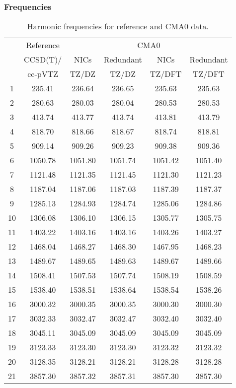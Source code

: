 \documentclass[10pt,oneside]{article}
\begin{document}
\begin{table}[h!]
\subsubsection*{Frequencies}
\centering
\caption{Harmonic frequencies for reference and CMA0 data.}
\begin{tabular}{cccccc}
\toprule
{} & Reference & \multicolumn{4}{c}{CMA0} \\
{} &  CCSD(T)/ &    NICs &  Redundant &    NICs & Redundant \\
{} &   cc-pVTZ &   TZ/DZ &      TZ/DZ &  TZ/DFT &    TZ/DFT \\
\midrule
1  &    235.41 &  236.64 &     236.65 &  235.63 &    235.63 \\
2  &    280.63 &  280.03 &     280.04 &  280.53 &    280.53 \\
3  &    413.74 &  413.77 &     413.74 &  413.81 &    413.79 \\
4  &    818.70 &  818.66 &     818.67 &  818.74 &    818.81 \\
5  &    909.14 &  909.26 &     909.23 &  909.38 &    909.36 \\
6  &   1050.78 & 1051.80 &    1051.74 & 1051.42 &   1051.40 \\
7  &   1121.48 & 1121.35 &    1121.45 & 1121.30 &   1121.23 \\
8  &   1187.04 & 1187.06 &    1187.03 & 1187.39 &   1187.37 \\
9  &   1285.13 & 1284.93 &    1284.74 & 1285.06 &   1284.86 \\
10 &   1306.08 & 1306.10 &    1306.15 & 1305.77 &   1305.75 \\
11 &   1403.22 & 1403.16 &    1403.16 & 1403.26 &   1403.27 \\
12 &   1468.04 & 1468.27 &    1468.30 & 1467.95 &   1468.23 \\
13 &   1489.67 & 1489.65 &    1489.63 & 1489.67 &   1489.66 \\
14 &   1508.41 & 1507.53 &    1507.74 & 1508.19 &   1508.59 \\
15 &   1538.40 & 1538.51 &    1538.64 & 1538.54 &   1538.26 \\
16 &   3000.32 & 3000.35 &    3000.35 & 3000.30 &   3000.30 \\
17 &   3032.33 & 3032.47 &    3032.47 & 3032.40 &   3032.40 \\
18 &   3045.11 & 3045.09 &    3045.09 & 3045.09 &   3045.09 \\
19 &   3123.33 & 3123.30 &    3123.30 & 3123.32 &   3123.32 \\
20 &   3128.35 & 3128.21 &    3128.21 & 3128.28 &   3128.28 \\
21 &   3857.30 & 3857.32 &    3857.31 & 3857.30 &   3857.30 \\
\bottomrule
\end{tabular}
\end{table}
\end{document}
